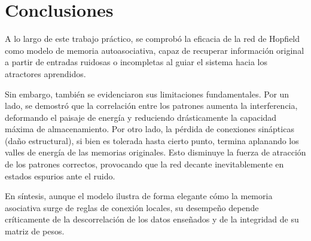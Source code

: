 \section{Conclusiones}
\label{sec:conclusion}

A lo largo de este trabajo práctico, se comprobó la eficacia de la red de Hopfield como modelo de memoria autoasociativa, capaz de recuperar información original a partir de entradas ruidosas o incompletas al guiar el sistema hacia los atractores aprendidos.

Sin embargo, también se evidenciaron sus limitaciones fundamentales. Por un lado, se demostró que la correlación entre los patrones aumenta la interferencia, deformando el paisaje de energía y reduciendo drásticamente la capacidad máxima de almacenamiento. Por otro lado, la pérdida de conexiones sinápticas (daño estructural), si bien es tolerada hasta cierto punto, termina aplanando los valles de energía de las memorias originales. Esto disminuye la fuerza de atracción de los patrones correctos, provocando que la red decante inevitablemente en estados espurios ante el ruido.

En síntesis, aunque el modelo ilustra de forma elegante cómo la memoria asociativa surge de reglas de conexión locales, su desempeño depende críticamente de la descorrelación de los datos enseñados y de la integridad de su matriz de pesos.